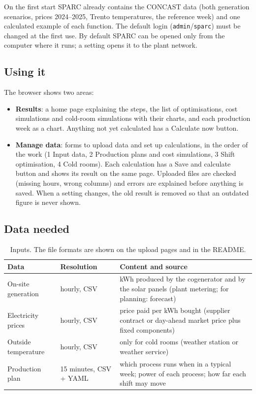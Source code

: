 \documentclass[10pt,a4paper]{scrartcl}
\renewcommand{\emph}[1]{\textcolor{accent}{#1}}
\begin{document}
  On the first start SPARC already contains the CONCAST data (both generation scenarios, prices
  2024--2025, Trento temperatures, the reference week) and one calculated example of each function.
  The default login (\texttt{admin}/\texttt{sparc}) must be changed at the first use. By default
  SPARC can be opened only from the computer where it runs; a setting opens it to the plant
  network.

  \subsection{Using it}

  The browser shows two areas:
  \begin{itemize}
    \item \textbf{Results}: a home page explaining the steps, the list of optimisations, cost
      simulations and cold-room simulations with their charts, and each production week as a chart.
      Anything not yet calculated has a \emph{Calculate now} button.
    \item \textbf{Manage data}: forms to upload data and set up calculations, in the order of the
      work (1 Input data, 2 Production plans and cost simulations, 3 Shift optimisation, 4 Cold
      rooms). Each calculation has a \emph{Save and calculate} button and shows its result on the
      same page. Uploaded files are checked (missing hours, wrong columns) and errors are explained
      before anything is saved. When a setting changes, the old result is removed so that an
      outdated figure is never shown.
  \end{itemize}

  \subsection{Data needed}

  \begin{table}[H]
  \small
  \centering
  \renewcommand{\arraystretch}{1.15}
  \begin{tabularx}{\textwidth}{@{}L{3.2cm} L{2.6cm} Y@{}}
  \toprule
  \textbf{Data} & \textbf{Resolution} & \textbf{Content and source} \\
  \midrule
  On-site generation & hourly, CSV & kWh produced by the cogenerator and by the solar panels (plant metering; for planning: forecast) \\
  Electricity prices & hourly, CSV & price paid per kWh bought (supplier contract or day-ahead market price plus fixed components) \\
  Outside temperature & hourly, CSV & only for cold rooms (weather station or weather service) \\
  Production plan & 15 minutes, CSV + YAML & which process runs when in a typical week; power of each process; how far each shift may move \\
  \bottomrule
  \end{tabularx}
  \caption{Inputs. The file formats are shown on the upload pages and in the README.}
  \end{table}
\end{document}
